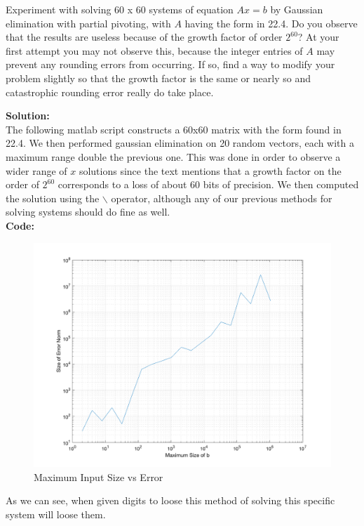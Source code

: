 \documentclass[12pt]{article}
\makeatletter
\theoremstyle{homework}
\newenvironment{exercise}[1]
{\def\@currentlabel{#1}\exercisecore}
{\endexercisecore}
\newcommand{\localhead}[1]{\par\smallskip\noindent\textbf{#1}\nobreak\\}%
\newcommand\solution{\localhead{Solution:}}
\makeatother
\begin{document}
\begin{exercise}{22.2} Experiment with solving 60 x 60 systems of equation $Ax = b$ by Gaussian elimination with partial pivoting, with 
  $A$ having the form in 22.4. Do you observe that the results are useless because of the growth factor of order $2^60$? At your first attempt you 
  may not observe this, because the integer entries of $A$ may prevent any rounding errors from occurring. If so, find a way to modify your problem slightly so that 
  the growth factor is the same or nearly so and catastrophic rounding error really do take place. \\
  \solution The following matlab script constructs a 60x60 matrix with the form found in 22.4. We then performed gaussian elimination on 20 random vectors, each with a maximum 
  range double the previous one. This was done in order to observe a wider range of $x$ solutions since the text mentions that a growth factor on the order of $2^{60}$ corresponds to 
  a loss of about 60 bits of precision. We then computed the solution using the $\backslash$ operator, although any of our previous methods for solving systems should do fine as well.\\
  \textbf{Code:}
  \begin{center}
  
  \end{center} 
  \begin{figure}[H] 
    \begin{center}  
    \caption{Maximum Input Size vs Error}  
    \includegraphics[width = \textwidth]{ErrorAnalysis.png}  
    \end{center}  
  \end{figure}
  As we can see, when given digits to loose this method of solving this specific system will loose them. 
  
\end{exercise}
\end{document}
